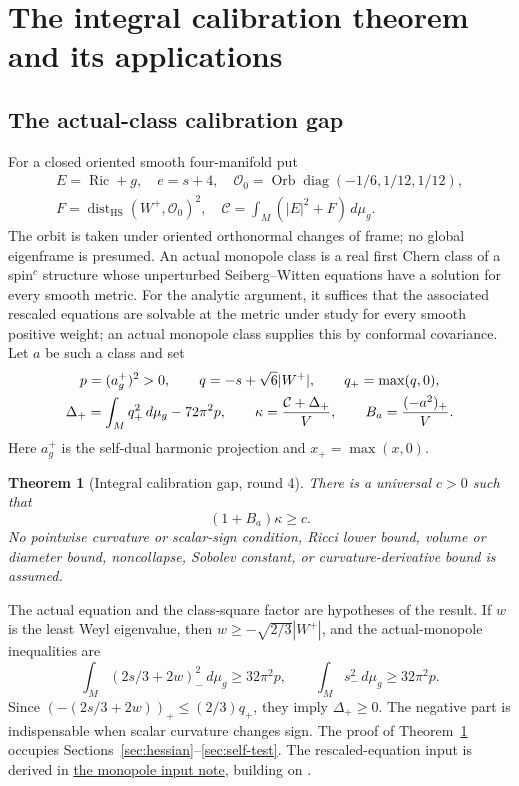 \documentclass[11pt,a4paper]{article}
\newtheorem{theorem}{Theorem}[section]
\theoremstyle{definition}
\theoremstyle{remark}
\DeclareMathOperator{\Ric}{Ric}
\DeclareMathOperator{\dist}{dist}
\DeclareMathOperator{\Orb}{Orb}
\newcommand{\dd}{\,d\mu_g}
\newcommand{\HS}{\mathrm{HS}}
\newcommand{\roundref}[2]{\href{run:../references/rounds/#1}{#2}}
\numberwithin{equation}{section}
\begin{document}
\section{The integral calibration theorem and its applications}\label{sec:theorems}
\subsection{The actual-class calibration gap}\label{sub:core-theorem}
For a closed oriented smooth four-manifold put
\begin{gather*}
 E=\Ric+g,\quad e=s+4,\quad
 \mathcal O_0=\Orb\operatorname{diag}(-1/6,1/12,1/12),\\
 F=\dist_{\HS}(W^+,\mathcal O_0)^2,
 \quad\mathcal C=\int_M(|E|^2+F)\dd.
\end{gather*}
The orbit is taken under oriented orthonormal changes of frame; no
global eigenframe is presumed. An actual monopole class is a real first
Chern class of a spin$^c$ structure whose unperturbed Seiberg--Witten
equations have a solution for every smooth metric. For the analytic
argument, it suffices that the associated rescaled equations are solvable
at the metric under study for every smooth positive weight; an actual
monopole class supplies this by conformal covariance. Let $a$ be such a
class and set
\begin{gather}
 p=(a_g^+)^2>0,\qquad q=-s+\sqrt6|W^+|,\qquad q_+=\max(q,0),\notag\\
 \Delta_+=\int_M q_+^2\dd-72\pi^2p,\qquad
 \kappa=\frac{\mathcal C+\Delta_+}{V},\qquad
 B_a=\frac{(-a^2)_+}{V}.\label{eq:defects}
\end{gather}
Here $a_g^+$ is the self-dual harmonic projection and $x_+=\max(x,0)$.

\begin{theorem}[Integral calibration gap, round 4]\label{thm:core}
There is a universal $c>0$ such that
\begin{equation}\label{eq:core-gap}
                         (1+B_a)\kappa\ge c.
\end{equation}
No pointwise curvature or scalar-sign condition, Ricci lower bound,
volume or diameter bound, noncollapse, Sobolev constant, or
curvature-derivative bound is assumed.
\end{theorem}
The actual equation and the class-square factor are hypotheses of the
result. If $w$ is the least Weyl eigenvalue, then
$w\ge-\sqrt{2/3}|W^+|$, and the actual-monopole inequalities are
\begin{equation}\label{eq:spectral-input}
 \int_M(2s/3+2w)_-^2\dd\ge32\pi^2p,
 \qquad \int_Ms_-^2\dd\ge32\pi^2p.
\end{equation}
Since $(-(2s/3+2w))_+\le(2/3)q_+$, they imply $\Delta_+\ge0$.
The negative part is indispensable when scalar curvature changes sign.
The proof of Theorem~\ref{thm:core} occupies
Sections~\ref{sec:hessian}--\ref{sec:self-test}. The rescaled-equation
input is derived in \roundref{round3_monopole_input.md}{the monopole input
note}, building on \cite{LeBrun01,LeBrunConvex}.
\end{document}
